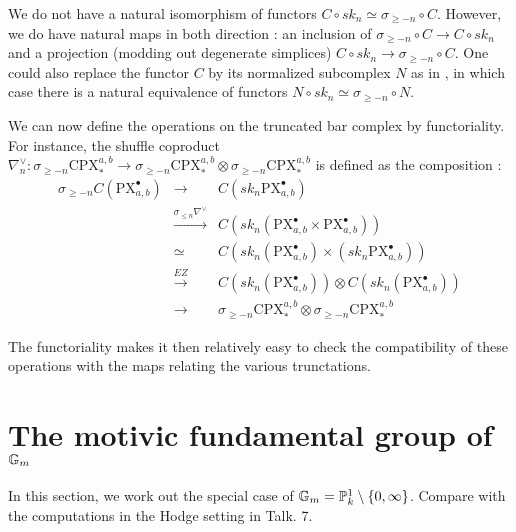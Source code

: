 We do not have a natural isomorphism of functors $C\circ sk_n\simeq \sigma_{\geq -n}\circ C$. However, we do have natural maps in both direction : an inclusion of $\sigma_{\geq -n}\circ C\rightarrow C\circ sk_n$ and a projection (modding out degenerate simplices) $C\circ sk_n
\rightarrow \sigma_{\geq -n}\circ C$. One could also replace the functor $C$ by its normalized subcomplex $N$ as in \cite{deligne-goncharov05}, in which case there is a natural equivalence of functors $N\circ sk_n\simeq \sigma_{\geq -n}\circ N$.

 We can now define the operations on the truncated bar complex by functoriality. For instance, the shuffle coproduct  $\nabla^\vee_n:\sigma_{\geq -n}\mathrm{CPX}^{a,b}_*\rightarrow \sigma_{\geq -n}\mathrm{CPX}^{a,b}_*\otimes \sigma_{\geq -n}\mathrm{CPX}^{a,b}_*$ is defined as the composition :
\begin{eqnarray*}
\sigma_{\geq -n}C(\mathrm{PX}^\bullet_{a,b}) & \rightarrow  & C(sk_n\mathrm{PX}^\bullet_{a,b})\\
& \stackrel{\sigma_{\leq n}\nabla^\vee}{\rightarrow} & C(sk_n(\mathrm{PX}^\bullet_{a,b}\times \mathrm{PX}^\bullet_{a,b}))\\
& \simeq & C(sk_n(\mathrm{PX}^\bullet_{a,b})\times (sk_n\mathrm{PX}^\bullet_{a,b}))\\
& \stackrel{EZ}{\rightarrow} & C(sk_n(\mathrm{PX}^\bullet_{a,b}))\otimes C(sk_n(\mathrm{PX}^\bullet_{a,b}))\\
& \rightarrow &  \sigma_{\geq -n}\mathrm{CPX}^{a,b}_*\otimes \sigma_{\geq -n}\mathrm{CPX}^{a,b}_*
\end{eqnarray*}

The functoriality makes it then relatively easy to check the compatibility of these operations with the maps relating the various trunctations.

\section{The motivic fundamental group of $\mathbb{G}_m$}
In this section, we work out the special case of $\mathbb{G}_m=\mathbb{P}^1_k\setminus \{0,\infty\}$. Compare with the computations in the Hodge setting in Talk. 7.

